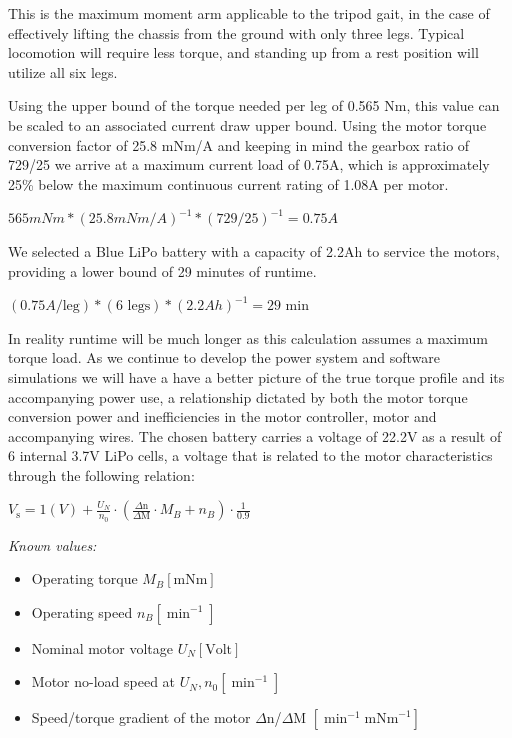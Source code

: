 \documentclass[11pt]{article}
\begin{document}
\vspace{0.25cm}

This is the maximum moment arm applicable to the tripod gait, in the case of effectively lifting the chassis from the ground with only three legs. Typical locomotion will require less torque, and standing up from a rest position will utilize all six legs.

Using the upper bound of the torque needed per leg of 0.565 Nm, this value can be scaled to an associated current draw upper bound. Using the motor torque conversion factor of 25.8 mNm/A and keeping in mind the gearbox ratio of 729/25 we arrive at a maximum current load of 0.75A, which is approximately 25\% below the maximum continuous current rating of 1.08A per motor.

\begin{center}
$ 565 mNm * (25.8 mNm/A)^{-1} * (729/25) ^{-1}= 0.75 A $
\end{center}

We selected a Blue LiPo battery with a capacity of 2.2Ah to service the motors, providing a lower bound of 29 minutes of runtime.

\begin{center}
$ (0.75 A/\text{leg}) * (6\text{ legs}) *(2.2Ah)^{-1} = \text{29 min} $
\end{center}

In reality runtime will be much longer as this calculation assumes a maximum torque load. As we continue to develop the power system and software simulations we will have a have a better picture of the true torque profile and its accompanying power use, a relationship dictated by  both the motor torque conversion power and inefficiencies in the motor controller, motor and accompanying wires.  The chosen battery carries a voltage of 22.2V as a result of 6 internal 3.7V LiPo cells, a voltage that is related to the motor characteristics through the following relation:

\begin{center}
  \item \(V_{\text{s}}=1(V)+\frac{U_N}{n_0}\cdot \left(\frac{\text{$\Delta $n}}{\text{$\Delta $M}}\cdot M_B+n_B\right)\cdot \frac{1}{0.9}\)
\end{center}

\emph{Known values:}

\begin{itemize}
  \item Operating torque \(M_B [\text{mNm}]\)
  \item Operating speed \(n_B \left[\min ^{-1}\right]\)
  \item Nominal motor voltage \(U_N [\text{Volt}]\)
  \item Motor no-load speed at \(U_N, n_0 \left[\min ^{-1}\right]\)
  \item Speed/torque gradient of the motor $\Delta $n/$\Delta $M \(\left[\min ^{-1} \text{mNm}^{-1}\right]\)
\end{itemize}
\end{document}
